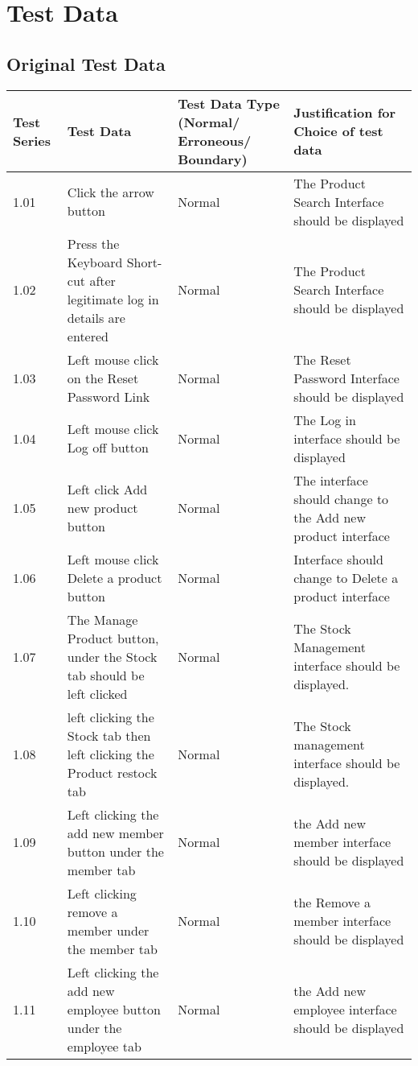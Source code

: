 \pagebreak

\section{Test Data}

\subsection{Original Test Data}
	\begin{flushleft}
    \begin{longtable}{|p{1.5cm}|p{2.5cm}|p{2cm}|p{4.5cm}|}
        \hline
        \textbf{Test Series} & \textbf{Test Data} & \textbf{Test Data Type (Normal/ Erroneous/ Boundary)} &  \textbf{Justification for Choice of test data}\\ \hline
	1.01 & Click the arrow button & Normal & The Product Search Interface should be displayed  \\ \hline
	1.02 & Press the Keyboard Short-cut after legitimate log in details are entered &  Normal & The Product Search Interface should be displayed \\ \hline
	1.03 & Left mouse click on the Reset Password Link &  Normal & The Reset Password Interface should be displayed  \\ \hline
	1.04 & Left mouse click Log off button &  Normal & The Log in interface should be displayed  \\ \hline
	1.05 & Left click Add new product button &  Normal &  The interface should change to the Add new product interface \\ \hline
	1.06 &  Left mouse click Delete a product button &  Normal & Interface should change to Delete a product interface \\ \hline
	1.07 & The Manage Product button, under the Stock tab should be left clicked &  Normal & The Stock Management interface should be displayed.  \\ \hline
	1.08 &  left clicking the Stock tab then left clicking the Product restock tab &  Normal & The Stock management interface should be displayed.  \\ \hline
	1.09 &  Left clicking the add new member button under the member tab &  Normal & the Add new member interface should be displayed \\ \hline
	1.10 & Left clicking remove a member under the member tab & Normal & the Remove a member interface should be displayed  \\ \hline
	1.11 & Left clicking the add new employee button under the employee tab &  Normal & the Add new employee interface should be displayed \\ \hline

\end{longtable}
\end{flushleft}
